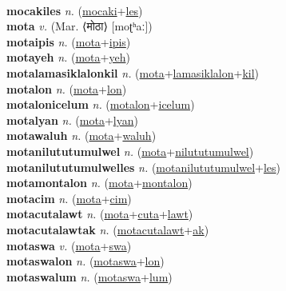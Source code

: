  \label{mocaki} \\
\textbf{mocakiles} \textit{n.} (\hyperref[mocaki]{mocaki}+\hyperref[les]{les})
 \label{mocakiles} \\
\textbf{mota} \textit{v.} (Mar. ⟨मोठा⟩ [moʈʰaː])
 \label{mota} \\
\textbf{motaipis} \textit{n.} (\hyperref[mota]{mota}+\hyperref[ipis]{ipis})
 \label{motaipis} \\
\textbf{motayeh} \textit{n.} (\hyperref[mota]{mota}+\hyperref[yeh]{yeh})
 \label{motayeh} \\
\textbf{motalamasiklalonkil} \textit{n.} (\hyperref[mota]{mota}+\hyperref[lamasiklalon]{lamasiklalon}+\hyperref[kil]{kil})
 \label{motalamasiklalonkil} \\
\textbf{motalon} \textit{n.} (\hyperref[mota]{mota}+\hyperref[lon]{lon})
 \label{motalon} \\
\textbf{motalonicelum} \textit{n.} (\hyperref[motalon]{motalon}+\hyperref[icelum]{icelum})
 \label{motalonicelum} \\
\textbf{motalyan} \textit{n.} (\hyperref[mota]{mota}+\hyperref[lyan]{lyan})
 \label{motalyan} \\
\textbf{motawaluh} \textit{n.} (\hyperref[mota]{mota}+\hyperref[waluh]{waluh})
 \label{motawaluh} \\
\textbf{motanilututumulwel} \textit{n.} (\hyperref[mota]{mota}+\hyperref[nilututumulwel]{nilututumulwel})
 \label{motanilututumulwel} \\
\textbf{motanilututumulwelles} \textit{n.} (\hyperref[motanilututumulwel]{motanilututumulwel}+\hyperref[les]{les})
 \label{motanilututumulwelles} \\
\textbf{motamontalon} \textit{n.} (\hyperref[mota]{mota}+\hyperref[montalon]{montalon})
 \label{motamontalon} \\
\textbf{motacim} \textit{n.} (\hyperref[mota]{mota}+\hyperref[cim]{cim})
 \label{motacim} \\
\textbf{motacutalawt} \textit{n.} (\hyperref[mota]{mota}+\hyperref[cuta]{cuta}+\hyperref[lawt]{lawt})
 \label{motacutalawt} \\
\textbf{motacutalawtak} \textit{n.} (\hyperref[motacutalawt]{motacutalawt}+\hyperref[ak]{ak})
 \label{motacutalawtak} \\
\textbf{motaswa} \textit{v.} (\hyperref[mota]{mota}+\hyperref[swa]{swa})
 \label{motaswa} \\
\textbf{motaswalon} \textit{n.} (\hyperref[motaswa]{motaswa}+\hyperref[lon]{lon})
 \label{motaswalon} \\
\textbf{motaswalum} \textit{n.} (\hyperref[motaswa]{motaswa}+\hyperref[lum]{lum})
